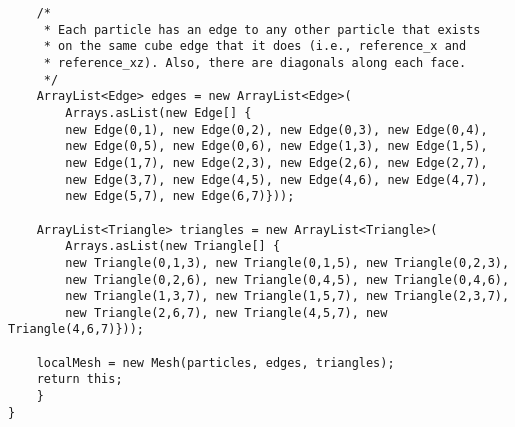 \begin{lstlisting}
	/*
	 * Each particle has an edge to any other particle that exists
	 * on the same cube edge that it does (i.e., reference_x and
	 * reference_xz). Also, there are diagonals along each face.
	 */
	ArrayList<Edge> edges = new ArrayList<Edge>(
	    Arrays.asList(new Edge[] {
		new Edge(0,1), new Edge(0,2), new Edge(0,3), new Edge(0,4),
		new Edge(0,5), new Edge(0,6), new Edge(1,3), new Edge(1,5),
		new Edge(1,7), new Edge(2,3), new Edge(2,6), new Edge(2,7), 
		new Edge(3,7), new Edge(4,5), new Edge(4,6), new Edge(4,7), 
		new Edge(5,7), new Edge(6,7)}));

	ArrayList<Triangle> triangles = new ArrayList<Triangle>(
	    Arrays.asList(new Triangle[] {
		new Triangle(0,1,3), new Triangle(0,1,5), new Triangle(0,2,3),
		new Triangle(0,2,6), new Triangle(0,4,5), new Triangle(0,4,6),
		new Triangle(1,3,7), new Triangle(1,5,7), new Triangle(2,3,7),
		new Triangle(2,6,7), new Triangle(4,5,7), new Triangle(4,6,7)}));

	localMesh = new Mesh(particles, edges, triangles);
	return this;
    }
}\end{lstlisting}

